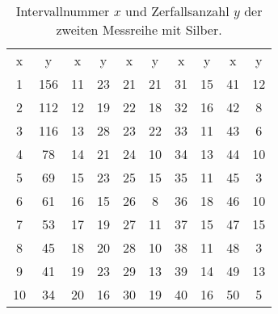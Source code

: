 \begin{table}[H]
    \centering
    \caption[short]{Intervallnummer $x$ und Zerfallsanzahl $y$ der zweiten Messreihe mit Silber.}
    \label{tab:silber2}
    \begin{tabular}{S S[table-format=3.0] S S S S S S S S}
        \toprule
        {x} & {y} & {x} & {y} & {x} & {y} & {x} & {y} & {x} & {y} \\
        \cmidrule(lr){1-2} \cmidrule(lr){3-4} \cmidrule(lr){5-6} \cmidrule(lr){7-8} \cmidrule(lr){9-10}
        1 & 156 & 11 & 23 & 21 & 21 & 31 & 15 & 41 & 12 \\
        2 & 112 & 12 & 19 & 22 & 18 & 32 & 16 & 42 &  8 \\
        3 & 116 & 13 & 28 & 23 & 22 & 33 & 11 & 43 &  6 \\
        4 &  78 & 14 & 21 & 24 & 10 & 34 & 13 & 44 & 10 \\
        5 &  69 & 15 & 23 & 25 & 15 & 35 & 11 & 45 &  3 \\
        6 &  61 & 16 & 15 & 26 &  8 & 36 & 18 & 46 & 10 \\
        7 &  53 & 17 & 19 & 27 & 11 & 37 & 15 & 47 & 15 \\
        8 &  45 & 18 & 20 & 28 & 10 & 38 & 11 & 48 &  3 \\
        9 &  41 & 19 & 23 & 29 & 13 & 39 & 14 & 49 & 13 \\
       10 &  34 & 20 & 16 & 30 & 19 & 40 & 16 & 50 &  5 \\
        \bottomrule
    \end{tabular}
\end{table}
